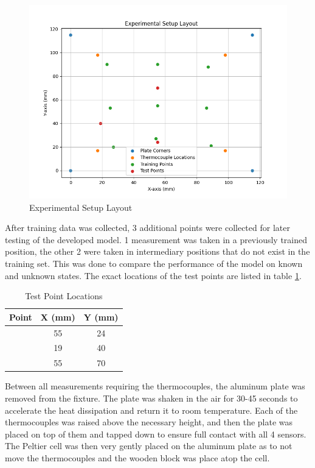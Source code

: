 \documentclass[12pt]{article}
\begin{document}
\begin{figure}[H]
    \centering
    \includegraphics[width=\linewidth]{images/Experimental Setup Layout.png}
    \caption{Experimental Setup Layout}
    \label{fig:experimental-layout} %
\end{figure}

After training data was collected, 3 additional points were collected for later testing of the developed model. 1 measurement was taken in a previously trained position, the other 2 were taken in intermediary positions that do not exist in the training set. This was done to compare the performance of the model on known and unknown states. The exact locations of the test points are listed in table \ref{tab:test_points}.

\begin{table}[H]
    \centering
    \caption{Test Point Locations}
    \label{tab:test_points}
    \begin{tabular}{|c|cc|}
        \hline
        Point & X (mm) & Y (mm) \\ \hline
        #1 & 55 & 24 \\
        #2 & 19 & 40 \\
        #3 & 55 & 70 \\ \hline
    \end{tabular}
\end{table}

Between all measurements requiring the thermocouples, the aluminum plate was removed from the fixture. The plate was shaken in the air for 30-45 seconds to accelerate the heat dissipation and return it to room temperature. Each of the thermocouples was raised above the necessary height, and then the plate was placed on top of them and tapped down to ensure full contact with all 4 sensors. The Peltier cell was then very gently placed on the aluminum plate as to not move the thermocouples and the wooden block was place atop the cell.
\end{document}

